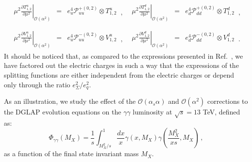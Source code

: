 \begin{equation}
\begin{array}{ll}
\begin{array}{rcl}
\displaystyle \left.\mu^2\frac{\partial T^u_{1,2}}{\partial \mu^2}\right|_{\mathcal{O}(\alpha^2)} &=&
\displaystyle e_u^4\mathcal{P}_{uu}^{+(0,2)}\otimes T^u_{1,2}
\end{array}\,, &
\begin{array}{rcl}
\displaystyle \left.\mu^2\frac{\partial T^d_{1,2}}{\partial \mu^2}\right|_{\mathcal{O}(\alpha^2)} &=&
\displaystyle e_d^4\mathcal{P}_{dd}^{+(0,2)} \otimes T^d_{1,2}
\end{array}\,,
\\
\\
\begin{array}{rcl}
\displaystyle \left.\mu^2\frac{\partial V^u_{1,2}}{\partial \mu^2}\right|_{\mathcal{O}(\alpha^2)} &=&
\displaystyle e_u^4\mathcal{P}_{uu}^{-(0,2)} \otimes V^u_{1,2}
\end{array}\,, &
\begin{array}{rcl}
\displaystyle \left.\mu^2\frac{\partial V^d_{1,2}}{\partial \mu^2}\right|_{\mathcal{O}(\alpha^2)} &=&
\displaystyle e_d^4\mathcal{P}_{dd}^{-(0,2)}\otimes V^d_{1,2}
\end{array}\,.
\end{array}
\end{equation}
It should be noticed that, as compared to the expressions presented in
Ref.~\cite{deFlorian:2016gvk}, we have factored out the electric
charges in such a way that the expressions of the splitting
functions are either independent from the electric charges or depend
only through the ratio $e_\Sigma^2/e_q^2$.

As an illustration, we study the effect of the
$\mathcal{O}(\alpha_s\alpha)$ and $\mathcal{O}(\alpha^2)$ corrections
to the DGLAP evolution equations on the $\gamma\gamma$ luminosity at
$\sqrt{s} = 13$ TeV, defined as:
\begin{equation}\label{eq:GammaGammaLumi}
\Phi_{\gamma\gamma}(M_X) = \frac1{s}\int_{M_X^2/s}^1
\frac{dx}{x} \gamma(x,M_X) \gamma\left(\frac{M_X^2}{xs},M_X\right)\,,
\end{equation}
as a function of the final state invariant mass $M_X$.

